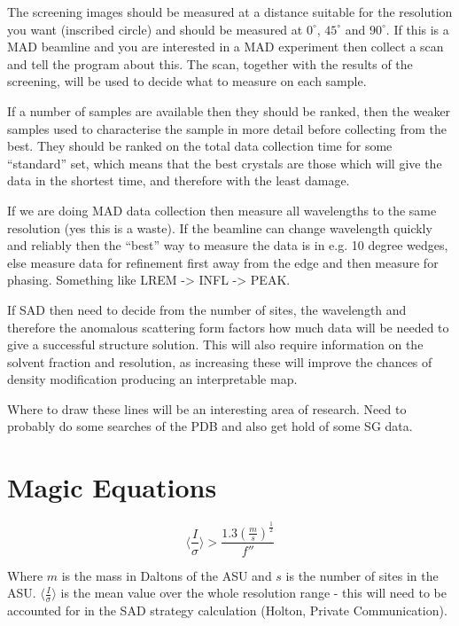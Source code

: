 \documentclass[a4paper, 11pt]{article}
\begin{document}
The screening images should be measured at a distance suitable for the 
resolution you want (inscribed circle) and should be measured at 
$0^{\circ}$, $45^{\circ}$ and $90^{\circ}$. If this is a MAD beamline and
you are interested in a MAD experiment then collect a scan and tell the 
program about this. The scan, together with the results of the screening,
will be used to decide what to measure on each sample.

If a number of samples are available then they should be ranked, then the
weaker samples used to characterise the sample in more detail before collecting
from the best. They should be ranked on the total data collection time for some
``standard'' set, which means that the best crystals are those which will 
give the data in the shortest time, and therefore with the least damage.

If we are doing MAD data collection then measure all wavelengths to the same
resolution (yes this is a waste). If the beamline can change wavelength 
quickly and reliably then the ``best'' way to measure the data is in e.g. 10
degree wedges, else measure data for refinement first away from the edge and
then measure for phasing. Something like LREM -> INFL -> PEAK. 

If SAD then need to decide from the number of sites, the wavelength and 
therefore the anomalous scattering form factors how much data will be needed
to give a successful structure solution. This will also require information
on the solvent fraction and resolution, as increasing these will improve the
chances of density modification producing an interpretable map.

Where to draw these lines will be an interesting area of research. Need to 
probably do some searches of the PDB and also get hold of some SG data.

\section{Magic Equations}

\begin{equation}
\langle \frac{I}{\sigma} \rangle > \frac{1.3 \left( \frac{m}{s} \right) 
^{\frac{1}{2}}}{f''}
\end{equation}

Where $m$ is the mass in Daltons of the ASU and $s$ is the number of sites
in the ASU. $\langle \frac{I}{\sigma} \rangle$ is the mean value over the
whole resolution range - this will need to be accounted for in the SAD strategy
calculation (Holton, Private Communication).
\end{document}
